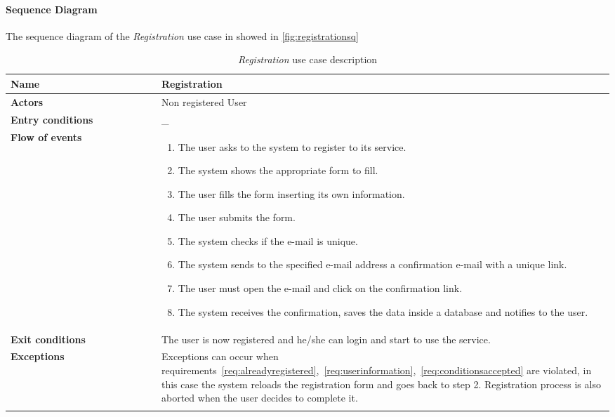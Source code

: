 \paragraph*{Sequence Diagram\\}
The sequence diagram of the \emph{Registration} use case in showed in \autoref{fig:registrationsq}
\newpage
\begin{longtable}{p{0.25\linewidth}|p{0.75\linewidth}}
	\hline
		\label{tab:registrationTAB}
	\textbf{Name} & \textbf{Registration} \\
	\hline
	\textbf{Actors} & Non registered User \\
	\hline
	\textbf{Entry conditions} & \_ \\
	\hline
	\textbf{Flow of events} & 
	\begin{enumerate}
		\item The user asks to the system to register to its service.
		\item The system shows the appropriate form to fill.
		\item The user fills the form inserting its own information.
		\item The user submits the form.
		\item The system checks if the e-mail is unique.
		\item The system sends to the specified e-mail address a confirmation e-mail with a unique link.
		\item The user must open the e-mail and click on the confirmation link.
		\item The system receives the confirmation, saves the data inside a database and notifies to the user.
	\end{enumerate}\\
	\hline
	\textbf{Exit conditions} & The user is now registered and he/she can login and start to use the service.\\
	\hline
	\textbf{Exceptions} & Exceptions can occur when requirements~\ref{req:alreadyregistered},~\ref{req:userinformation},~\ref{req:conditionsaccepted} are violated, in this case the system reloads the registration form and goes back to step 2. 
	Registration process is also aborted when the user decides to complete it. \\
	\hline
	\caption{\emph{Registration} use case description}
\end{longtable}

